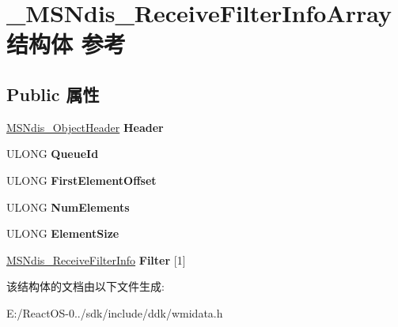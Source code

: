 \hypertarget{struct___m_s_ndis___receive_filter_info_array}{}\section{\+\_\+\+M\+S\+Ndis\+\_\+\+Receive\+Filter\+Info\+Array结构体 参考}
\label{struct___m_s_ndis___receive_filter_info_array}
\subsection*{Public 属性}
\begin{DoxyCompactItemize}
\item 
\mbox{\label{struct___m_s_ndis___receive_filter_info_array_ac5728ccca0f1364a860e7d92eceb684e}} 
\hyperlink{struct___m_s_ndis___object_header}{M\+S\+Ndis\+\_\+\+Object\+Header} {\bfseries Header}
\item 
\mbox{\label{struct___m_s_ndis___receive_filter_info_array_abdc9a7a63b730be89469c09ab87bf6c7}} 
U\+L\+O\+NG {\bfseries Queue\+Id}
\item 
\mbox{\label{struct___m_s_ndis___receive_filter_info_array_a2e0e7b5efd9cdf97e429183adc782ff8}} 
U\+L\+O\+NG {\bfseries First\+Element\+Offset}
\item 
\mbox{\label{struct___m_s_ndis___receive_filter_info_array_aaf7db6891370b53b4f4768f27d56e479}} 
U\+L\+O\+NG {\bfseries Num\+Elements}
\item 
\mbox{\label{struct___m_s_ndis___receive_filter_info_array_af737ece28ed460a3237d02feffe9180a}} 
U\+L\+O\+NG {\bfseries Element\+Size}
\item 
\mbox{\label{struct___m_s_ndis___receive_filter_info_array_ad7c732ad154de4fcd79036465eb2e0f2}} 
\hyperlink{struct___m_s_ndis___receive_filter_info}{M\+S\+Ndis\+\_\+\+Receive\+Filter\+Info} {\bfseries Filter} \mbox{[}1\mbox{]}
\end{DoxyCompactItemize}


该结构体的文档由以下文件生成\+:\begin{DoxyCompactItemize}
\item 
E\+:/\+React\+O\+S-\/0../sdk/include/ddk/wmidata.\+h\end{DoxyCompactItemize}
